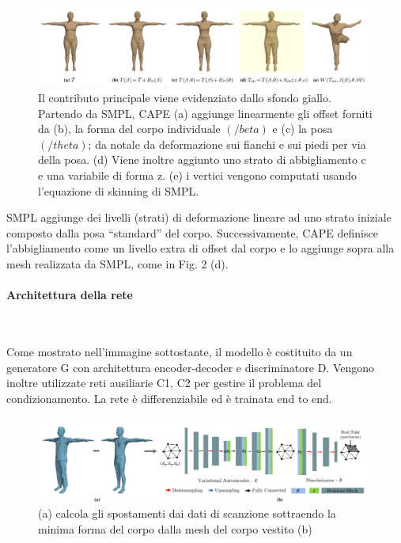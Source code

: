 \begin{figure}[ht!]
  \centering
  \includegraphics[scale=0.4]{Images/IntroductionPic/CAPE.png}
  \caption{Il contributo principale viene evidenziato dallo sfondo giallo.\\
  Partendo da SMPL, CAPE (a) aggiunge linearmente gli offset forniti da (b), la forma del corpo individuale $(/beta)$ e (c) la posa $(/theta)$; da notale da deformazione sui fianchi e sui piedi per via della posa. (d) Viene inoltre aggiunto uno strato di abbigliamento c e una variabile di forma z. (e) i vertici vengono computati usando l'equazione di skinning di SMPL.}
  \label{fig:CAPE}
\end{figure}

\medskip

SMPL aggiunge dei livelli (strati) di deformazione lineare ad uno strato iniziale composto dalla posa “standard” del corpo.
Successivamente, CAPE definisce l’abbigliamento come  un livello extra di offset dal corpo e lo aggiunge sopra alla mesh realizzata da SMPL, come in Fig. 2 (d).

\newpage

\paragraph{Architettura della rete}~
\medskip

Come mostrato nell'immagine sottostante, il modello è costituito da un generatore
G con architettura encoder-decoder e discriminatore D. Vengono inoltre utilizzate reti ausiliarie C1, C2 per gestire il problema del condizionamento. La rete è differenziabile ed è trainata end to end.

\begin{figure}[ht!]
  \centering
  \includegraphics[scale=0.4]{Images/IntroductionPic/CAPENetwork.png}
  \caption{(a) calcola gli spostamenti dai dati di scanzione sottraendo la minima forma del corpo dalla mesh del corpo vestito (b) }
  \label{fig:CAPENetwork}
\end{figure}


